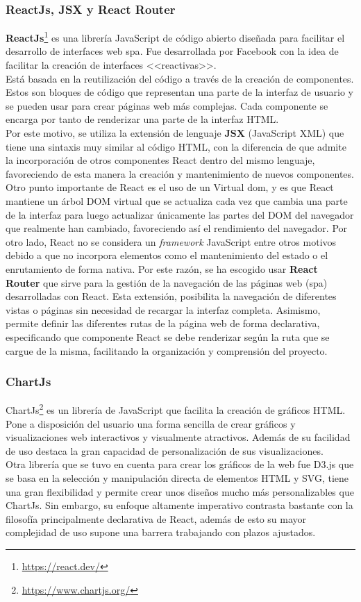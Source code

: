 \subsubsection{ReactJs, JSX y React Router}
\textbf{ReactJs}\footnote{\url{https://react.dev/}} es una librería JavaScript de código abierto diseñada para facilitar el desarrollo de interfaces web \acrfull{spa}. Fue desarrollada por Facebook con la idea de facilitar la creación de interfaces <<reactivas>>.\\
Está basada en la reutilización del código a través de la creación de componentes. Estos son bloques de código que representan una parte de la interfaz de usuario y se pueden usar para crear páginas web más complejas. Cada componente se encarga por tanto de renderizar una parte de la interfaz HTML.\\
Por este motivo, se utiliza la extensión de lenguaje \textbf{JSX} (JavaScript XML) que tiene una sintaxis muy similar al código HTML, con la diferencia de que admite la incorporación de otros componentes React dentro del mismo lenguaje, favoreciendo de esta manera la creación y mantenimiento de nuevos componentes.\\
Otro punto importante de React es el uso de un Virtual \acrlong{dom}, y es que React mantiene un árbol DOM virtual que se actualiza cada vez que cambia una parte de la interfaz para luego actualizar únicamente las partes del DOM del navegador que realmente han cambiado, favoreciendo así el rendimiento del navegador.
Por otro lado, React no se considera un \textit{framework} JavaScript entre otros motivos debido a que no incorpora elementos como el mantenimiento del estado o el enrutamiento de forma nativa. Por este razón, se ha escogido usar \textbf{React Router} que sirve para la gestión de la navegación de las páginas web (\acrlong{spa}) desarrolladas con React. Esta extensión, posibilita la navegación de diferentes vistas o páginas sin necesidad de recargar la interfaz completa. Asimismo, permite definir las diferentes rutas de la página web de forma declarativa, especificando que componente React se debe renderizar según la ruta que se cargue de la misma, facilitando la organización y comprensión del proyecto.
\subsubsection{ChartJs}
ChartJs\footnote{\url{https://www.chartjs.org/}} es un librería de JavaScript que facilita la creación de gráficos HTML. Pone a disposición del usuario una forma sencilla de crear gráficos y visualizaciones web interactivos y visualmente atractivos. Además de su facilidad de uso destaca la gran capacidad de personalización de sus visualizaciones.
\\Otra librería que se tuvo en cuenta para crear los gráficos de la web fue D3.js que se basa en la selección y manipulación directa de elementos HTML y SVG, tiene una gran flexibilidad y permite crear unos diseños mucho más personalizables que ChartJs. Sin embargo, su enfoque altamente imperativo contrasta bastante con la filosofía principalmente declarativa de React, además de esto su mayor complejidad de uso supone una barrera trabajando con plazos ajustados.
